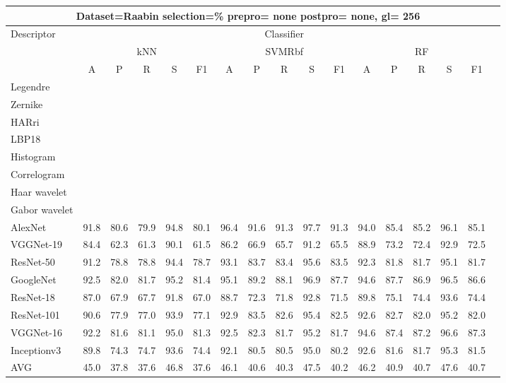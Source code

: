 \documentclass[12pt,italian]{article}
\begin{document}
\begin{tiny}
 \pagebreak 
\begin{longtable}{lcccccccccccccccc}
\toprule
\multicolumn{16}{c}{Dataset=Raabin selection=\% prepro= none postpro= none, gl= 256} \\ 
\toprule
Descriptor & \multicolumn{15}{c}{Classifier} \\ 
& \multicolumn{5}{c}{kNN} & \multicolumn{5}{c}{SVMRbf} & \multicolumn{5}{c}{RF} \\ 
& A & P & R & S & F1 & A & P & R & S & F1 & A & P & R & S & F1 \\ 
\midrule
Legendre \\ 
Zernike \\ 
HARri \\ 
LBP18 \\ 
Histogram \\ 
Correlogram \\ 
Haar wavelet \\ 
Gabor wavelet \\ 
AlexNet & 91.8 & 80.6 & 79.9 & 94.8 & 80.1 & 96.4 & 91.6 & 91.3 & 97.7 & 91.3 & 94.0 & 85.4 & 85.2 & 96.1 & 85.1 \\ 
VGGNet-19 & 84.4 & 62.3 & 61.3 & 90.1 & 61.5 & 86.2 & 66.9 & 65.7 & 91.2 & 65.5 & 88.9 & 73.2 & 72.4 & 92.9 & 72.5 \\ 
ResNet-50 & 91.2 & 78.8 & 78.8 & 94.4 & 78.7 & 93.1 & 83.7 & 83.4 & 95.6 & 83.5 & 92.3 & 81.8 & 81.7 & 95.1 & 81.7 \\ 
GoogleNet & 92.5 & 82.0 & 81.7 & 95.2 & 81.4 & 95.1 & 89.2 & 88.1 & 96.9 & 87.7 & 94.6 & 87.7 & 86.9 & 96.5 & 86.6 \\ 
ResNet-18 & 87.0 & 67.9 & 67.7 & 91.8 & 67.0 & 88.7 & 72.3 & 71.8 & 92.8 & 71.5 & 89.8 & 75.1 & 74.4 & 93.6 & 74.4 \\ 
ResNet-101 & 90.6 & 77.9 & 77.0 & 93.9 & 77.1 & 92.9 & 83.5 & 82.6 & 95.4 & 82.5 & 92.6 & 82.7 & 82.0 & 95.2 & 82.0 \\ 
VGGNet-16 & 92.2 & 81.6 & 81.1 & 95.0 & 81.3 & 92.5 & 82.3 & 81.7 & 95.2 & 81.7 & 94.6 & 87.4 & 87.2 & 96.6 & 87.3 \\ 
Inceptionv3 & 89.8 & 74.3 & 74.7 & 93.6 & 74.4 & 92.1 & 80.5 & 80.5 & 95.0 & 80.2 & 92.6 & 81.6 & 81.7 & 95.3 & 81.5 \\ 
\hline
AVG & 45.0 & 37.8 & 37.6 & 46.8 & 37.6 & 46.1 & 40.6 & 40.3 & 47.5 & 40.2 & 46.2 & 40.9 & 40.7 & 47.6 & 40.7 \\ 
\hline
\bottomrule
\end{longtable} 

 \pagebreak 
\end{tiny} 
 
\end{document}
